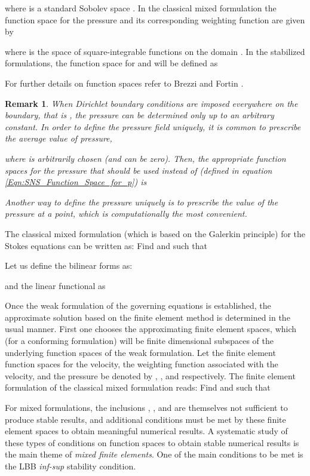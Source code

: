 \documentclass[11pt]{amsart}
\newtheorem{remark}[theorem]{Remark}
\begin{document}
where  is a standard Sobolev space \cite{Brezzi}. In the classical mixed 
formulation the function space for the pressure  and its corresponding 
weighting function  are given by 

where  is the space of square-integrable functions on the domain . In the stabilized formulations, the function space for  and  will be defined as
 
For further details on function spaces refer to Brezzi and Fortin \cite{Brezzi}. 
\begin{remark}
  When Dirichlet boundary conditions are imposed everywhere on the boundary, 
  that is , the pressure 
  can be determined only up to an arbitrary constant. In order to define the 
  pressure field uniquely, it is common to prescribe the average value of pressure,
  
  where  is arbitrarily chosen (and can be zero).  Then, the appropriate function spaces for the pressure that should be used instead of 
   (defined in equation \eqref{Eqn:SNS_Function_Space_for_p}) is 
  
  Another way to define the pressure uniquely is to prescribe the value of the 
  pressure at a point, which is computationally the most convenient. 
\end{remark}

The classical mixed formulation (which is based on the Galerkin principle) for the 
Stokes equations can be written as: Find  and  such that 

Let us define the bilinear forms as: 

and the linear functional as 


Once the weak formulation of the governing equations is established, the approximate 
solution based on the finite element method is determined in the usual manner. First 
one chooses the approximating finite element spaces, which (for a conforming formulation) 
will be finite dimensional subspaces of the underlying function spaces of the weak 
formulation. Let the finite element function spaces for the velocity, the weighting 
function associated with the velocity, and the pressure be denoted by , , and  respectively. The finite element formulation of the classical 
mixed formulation reads: Find  and 
 such that 

For mixed formulations, the inclusions , , and  are 
themselves not sufficient to produce stable results, and additional 
conditions must be met by these finite element spaces to obtain 
meaningful numerical results. A systematic study of these types of 
conditions on function spaces to obtain stable numerical results 
is the main theme of \emph{mixed finite elements}. One of the main 
conditions to be met is the LBB \emph{inf-sup} stability condition. 
\end{document}
